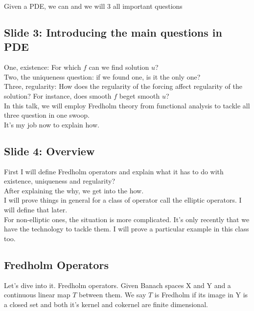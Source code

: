 \documentclass{article}
\begin{document}
Given a PDE, we can and we will 3 all important questions


\subsection{Slide 3: Introducing the main questions in PDE} 
One, existence: For which $f$ can we find solution $u$? \\
Two, the uniqueness question: if we found one, is it the only one? \\
Three, regularity: How does the regularity of the forcing affect regularity of the solution? For instance, does smooth $f$ beget smooth $u$? \\

In this talk, we will employ Fredholm theory from functional analysis to tackle all three question in one swoop. \\
It's my job now to explain how. 



\subsection{Slide 4: Overview}
First I will define Fredholm operators and explain what it has to do with existence, uniqueness and regularity? \\
After explaining the why, we get into the how. \\
I will prove things in general for a class of operator call the elliptic operators. I will define that later. \\
For non-elliptic ones, the situation is more complicated. It's only recently that we have the technology to tackle them. I will prove a particular example in this class too. 


\subsection{Fredholm Operators}
Let's dive into it. Fredholm operators. Given Banach spaces X and Y and a continuous linear map $T$ between them. We say $T$ is Fredholm if its image in Y is a closed set and both it's kernel and cokernel are finite dimensional. \\
\end{document}
